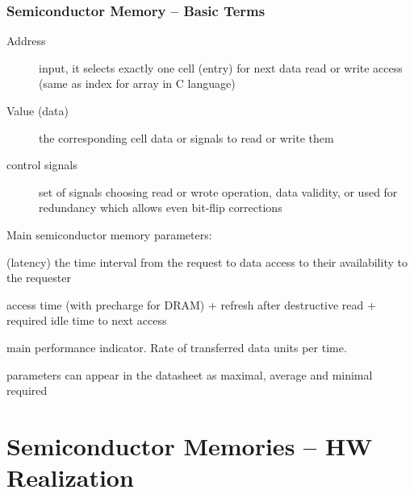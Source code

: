 \documentclass{beamer}
\begin{document}
\begin{frame}
\frametitle{Semiconductor Memory -- Basic Terms}

\begin{description}
 \item[Address] input, it selects exactly one cell (entry) for next data read or write access (same as index for array in C language)
 \item[Value (data)] the corresponding cell data or signals to read or write them
 \item[control signals] set of signals choosing read or wrote operation, data validity, or used for redundancy which allows even bit-flip corrections
\end{description}

Main semiconductor memory parameters:

\begin{description}
  \item[Access time] (latency) the time interval from the request to data access to their availability to the requester
  \item[Read/write cycle time] access time (with precharge for DRAM) + refresh after destructive read + required idle time to next access
  \item[Throughput/bandwidth] main performance indicator. Rate of transferred data units per time.
  \item parameters can appear in the datasheet as maximal, average and minimal required
\end{description}

\end{frame}

\section{Semiconductor Memories -- HW Realization}
\end{document}
